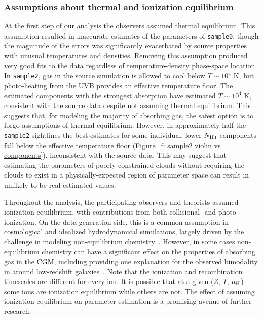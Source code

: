 \documentclass[fleqn,usenatbib]{mnras}
\begin{document}
\subsubsection{Assumptions about thermal and ionization equilibrium}

At the first step of our analysis the observers assumed thermal equilibrium.
This assumption resulted in inaccurate estimates of the parameters of \texttt{sample0}, though the magnitude of the errors was significantly exacerbated by source properties with unusual temperatures and densities.
Removing this assumption produced very good fits to the data regardless of temperature-density phase-space location.
In \texttt{sample2}, gas in the source simulation is allowed to cool below $T \sim 10^4$ K,
but photo-heating from the UVB provides an effective temperature floor.
The estimated components with the strongest absorption have estimated $T \sim 10^4$ K,
consistent with the source data despite not assuming thermal equilibrium.
This suggests that, for modeling the majority of absorbing gas, the safest option is to forgo assumptions of thermal equilibrium.
However, in approximately half the \texttt{sample2} sightlines the best estimates for some individual, lower-$N_{\ion{H}{I}}$ components fall below the effective temperature floor (Figure~\ref{f: sample2 violin vs components}),
inconsistent with the source data.
This may suggest that estimating the parameters of poorly-constrained clouds without requiring the clouds to exist in a physically-expected region of parameter space can result in unlikely-to-be-real estimated values.

Throughout the analysis, the participating observers and theorists assumed ionization equilibrium, with contributions from both collisional- and photo-ionization.
On the data-generation side, this is a common assumption in cosmological and idealized hydrodynamical simulations, largely driven by the challenge in modeling non-equilibrium chemistry~\citep[e.g.][]{richings2014Nonequilibrium}.
However, in some cases non-equilibrium chemistry can have a significant effect on the properties of absorbing gas in the CGM, including providing one explanation for the observed bimodality in  around low-redshift galaxies~\citep{oppenheimer2016Bimodality}.
Note that the ionization and recombination timescales are different for every ion.
It is possible that at a given ($Z$, $T$, $n_{\rm H}$) some ions are ionization equilibrium while others are not.
The effect of assuming ionization equilibrium on parameter estimation is a promising avenue of further research.
\end{document}
